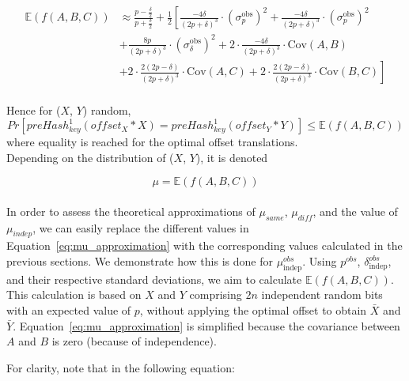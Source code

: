\begin{equation}
    \begin{aligned}
    \mathbb{E}(f(A,B,C)) &\approx \frac{p - \frac{\delta}{2}}{p + \frac{\delta}{2}} + \frac{1}{2} \left[ \frac{-4\delta}{(2p + \delta)^3}\cdot({\sigma^\text{obs}_p})^2 + \frac{-4\delta}{(2p + \delta)^3}\cdot({\sigma^\text{obs}_p})^2 \right. \\[2mm]
    & \left. + \frac{8p}{(2p + \delta)^3}\cdot({\sigma^\text{obs}_\delta})^2 + 2\cdot\frac{-4\delta}{(2p + \delta)^3}\cdot\text{Cov}(A,B) \right. \\[2mm]
    & \left. + 2\cdot\frac{2(2p - \delta)}{(2p + \delta)^3}\cdot\text{Cov}(A,C) + 2\cdot\frac{2(2p - \delta)}{(2p + \delta)^3}\cdot\text{Cov}(B,C) \right]\\
    \end{aligned}
    \label{eq:mu_approximation}
\end{equation}

Hence for (\(X\), \(Y\)) random,
\begin{equation}
    \label{eq:mu_leq}
    Pr[preHash_{key}^1(offset_X * X) = preHash_{key}^1(offset_Y * Y)] \leq \mathbb{E}(f(A,B,C))
\end{equation}
where equality is reached for the optimal offset translations.\\

Depending on the distribution of (\(X\), \(Y\)), it is denoted

\begin{equation} \label{eq:mu}
    \mu = \mathbb{E}(f(A,B,C))
\end{equation}\\

In order to assess the theoretical approximations of $\mu_{same}$, $\mu_{diff}$, and the value of $\mu_{indep}$, we can easily replace the different values in Equation~\ref{eq:mu_approximation} with the corresponding values calculated in the previous sections. We demonstrate how this is done for \( \mu_{\text{indep}}^{obs} \). Using \( p^{obs} \), \(\delta_{\text{indep}}^{obs}\), and their respective standard deviations, we aim to calculate \(\mathbb{E}(f(A,B,C))\). This calculation is based on \(X\) and \(Y\) comprising \(2n\) independent random bits with an expected value of \(p\), without applying the optimal offset to obtain \(\bar{X}\) and \(\bar{Y}\). Equation~\ref{eq:mu_approximation} is simplified because the covariance between \(A\) and \(B\) is zero (because of independence).

For clarity, note that in the following equation:

